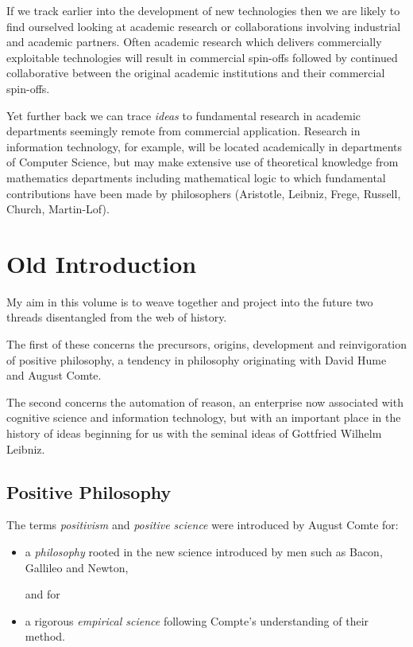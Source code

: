 If we track earlier into the development of new technologies then we are likely to find ourselved looking at academic research or collaborations involving industrial and academic partners.
Often academic research which delivers commercially exploitable technologies will result in commercial spin-offs followed by continued collaborative between the original academic institutions and their commercial spin-offs.

Yet further back we can trace \emph{ideas} to fundamental research in academic departments seemingly remote from commercial application.
Research in information technology, for example, will be located academically in departments of Computer Science, but may make extensive use of theoretical knowledge from mathematics departments including mathematical logic to which fundamental contributions have been made by philosophers (Aristotle, Leibniz, Frege, Russell, Church, Martin-Lof).


\chapter{Old Introduction}\label{Old Introduction}

My aim in this volume is to weave together and project into the future two threads disentangled from the web of history.

The first of these concerns the precursors, origins, development and reinvigoration of positive philosophy,
a tendency in philosophy originating with David Hume and August Comte.

The second concerns the automation of reason, an enterprise now associated with cognitive science
and information technology, but with an important place in the history of ideas beginning for us
with the seminal ideas of Gottfried Wilhelm Leibniz.

\section{Positive Philosophy}

The terms \emph{positivism} and \emph{positive science} were introduced by August Comte for:
\begin{itemize}
\item a \emph{philosophy} rooted in the new science introduced by men such as Bacon, Gallileo and Newton,

and for
\item a rigorous \emph{empirical science} following Compte's understanding of their method.
\end{itemize}

